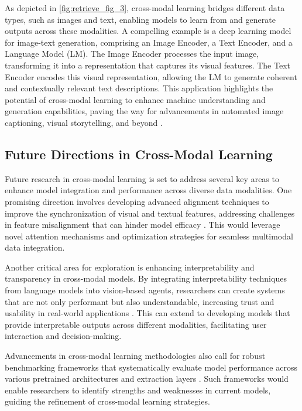 As depicted in \autoref{fig:retrieve_fig_3}, cross-modal learning bridges different data types, such as images and text, enabling models to learn from and generate outputs across these modalities. A compelling example is a deep learning model for image-text generation, comprising an Image Encoder, a Text Encoder, and a Language Model (LM). The Image Encoder processes the input image, transforming it into a representation that captures its visual features. The Text Encoder encodes this visual representation, allowing the LM to generate coherent and contextually relevant text descriptions. This application highlights the potential of cross-modal learning to enhance machine understanding and generation capabilities, paving the way for advancements in automated image captioning, visual storytelling, and beyond \cite{BLIP:Boots7}.

\subsection{Future Directions in Cross-Modal Learning} \label{subsec:Future Directions in Cross-Modal Learning}

Future research in cross-modal learning is set to address several key areas to enhance model integration and performance across diverse data modalities. One promising direction involves developing advanced alignment techniques to improve the synchronization of visual and textual features, addressing challenges in feature misalignment that can hinder model efficacy \cite{li2023blip}. This would leverage novel attention mechanisms and optimization strategies for seamless multimodal data integration.

Another critical area for exploration is enhancing interpretability and transparency in cross-modal models. By integrating interpretability techniques from language models into vision-based agents, researchers can create systems that are not only performant but also understandable, increasing trust and usability in real-world applications \cite{jucys2024interpretabilityactionexploratoryanalysis}. This can extend to developing models that provide interpretable outputs across different modalities, facilitating user interaction and decision-making.

Advancements in cross-modal learning methodologies also call for robust benchmarking frameworks that systematically evaluate model performance across various pretrained architectures and extraction layers \cite{pihlgren2024systematicperformanceanalysisdeep}. Such frameworks would enable researchers to identify strengths and weaknesses in current models, guiding the refinement of cross-modal learning strategies.


